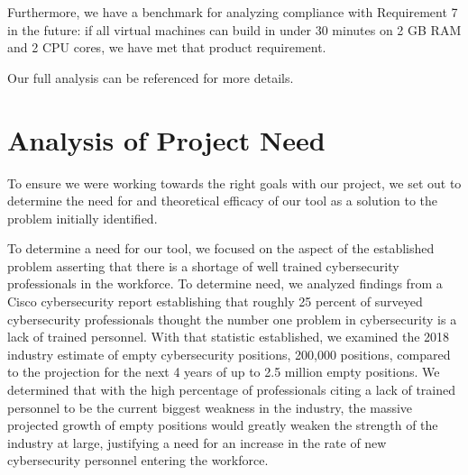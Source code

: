 \documentclass[openright]{report}
\begin{document}
\par Furthermore, we have a benchmark for analyzing compliance with Requirement 7 in the future: if all virtual machines can build in under 30 minutes on 2 GB RAM and 2 CPU cores, we have met that product requirement. 

\par Our full analysis can be referenced for more details.

\section{Analysis of Project Need}

\par To ensure we were working towards the right goals with our project, we set out to determine the need for and theoretical efficacy of our tool as a solution to the problem initially identified.

\par To determine a need for our tool, we focused on the aspect of the established problem asserting that there is a shortage of well trained cybersecurity professionals in the workforce. To determine need, we analyzed findings from a Cisco cybersecurity report \cite{Cisco__annual_report} establishing that roughly 25 percent of surveyed cybersecurity professionals thought the number one problem in cybersecurity is a lack of trained personnel. With that statistic established, we examined the 2018 industry estimate of empty cybersecurity positions, 200,000 positions, compared to the projection for the next 4 years of up to 2.5 million empty positions. We determined that with the high percentage of professionals citing a lack of trained personnel to be the current biggest weakness in the industry, the massive projected growth of empty positions would greatly weaken the strength of the industry at large, justifying a need for an increase in the rate of new cybersecurity personnel entering the workforce.
\end{document}
